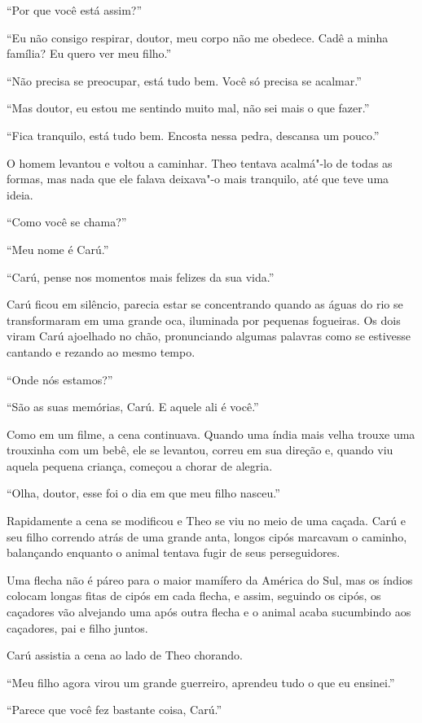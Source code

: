 ``Por que você está assim?''

``Eu não consigo respirar, doutor, meu corpo não me obedece. Cadê a
minha família? Eu quero ver meu filho.''

``Não precisa se preocupar, está tudo bem. Você só precisa se acalmar.''

``Mas doutor, eu estou me sentindo muito mal, não sei mais o que
fazer.''

``Fica tranquilo, está tudo bem. Encosta nessa pedra, descansa um
pouco.''

O homem levantou e voltou a caminhar. Theo tentava acalmá"-lo de
todas as formas, mas nada que ele falava deixava"-o mais tranquilo, até
que teve uma ideia.

``Como você se chama?''

``Meu nome é Carú.''

``Carú, pense nos momentos mais felizes da sua vida.''

Carú ficou em silêncio, parecia estar se concentrando quando as águas do
rio se transformaram em uma grande oca, iluminada por pequenas
fogueiras. Os dois viram Carú ajoelhado no chão, pronunciando algumas
palavras como se estivesse cantando e rezando ao mesmo tempo.

``Onde nós estamos?''

``São as suas memórias, Carú. E aquele ali é você.''

Como em um filme, a cena continuava. Quando uma índia mais velha trouxe
uma trouxinha com um bebê, ele se levantou, correu em sua direção e,
quando viu aquela pequena criança, começou a chorar de alegria.

``Olha, doutor, esse foi o dia em que meu filho nasceu.''

Rapidamente a cena se modificou e Theo se viu no meio de uma caçada.
Carú e seu filho correndo atrás de uma grande anta, longos cipós
marcavam o caminho, balançando enquanto o animal tentava fugir de seus
perseguidores.

Uma flecha não é páreo para o maior mamífero da América do Sul, mas os
índios colocam longas fitas de cipós em cada flecha, e assim, seguindo
os cipós, os caçadores vão alvejando uma após outra flecha e o
animal acaba sucumbindo aos caçadores, pai e filho juntos.

Carú assistia a cena ao lado de Theo chorando.

``Meu filho agora virou um grande guerreiro, aprendeu tudo o que eu
ensinei.''

``Parece que você fez bastante coisa, Carú.''

